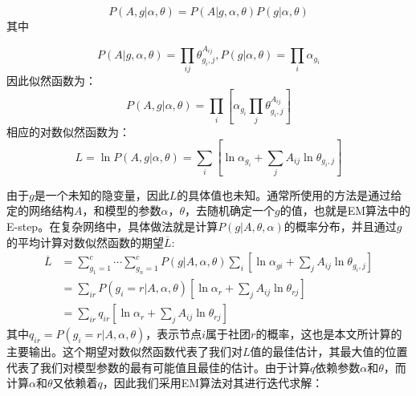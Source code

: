 \documentclass[a4paper,12pt,openany,oneside,utf-8]{ctexbook}
\begin{document}
    \begin{equation}
    P(A,g|\alpha,\theta)=P(A|g,\alpha,\theta)P(g|\alpha,\theta)
    \end{equation}
    其中
    
    \begin{equation}
        P(A|g,\alpha,\theta)=\prod_{i j}\theta_{g_i,j}^{A_{i j}},P(g|\alpha,\theta)=\prod_{i}\alpha_{g_i}
    \end{equation}
    因此似然函数为：
    \begin{equation}
        P(A,g|\alpha,\theta)=\prod_i[\alpha_{g_i}\prod_j\theta_{g_i,j}^{A_{i j}}]
    \end{equation}
    相应的对数似然函数为：
    \begin{equation}
    L=\ln P(A,g|\alpha,\theta)=\sum_i[\ln\alpha_{g_i}+\sum_j A_{i j}\ln\theta_{g_i,j}]
    \end{equation}
    
    由于$g$是一个未知的隐变量，因此$L$的具体值也未知。通常所使用的方法是通过给定的网络结构$A$，和模型的参数$\alpha$，$\theta$，去随机确定一个$g$的值，也就是EM算法中的E-step。在复杂网络中，具体做法就是计算$P(g|A,\theta,\alpha)$的概率分布，并且通过$g$的平均计算对数似然函数的期望$\overline{L}$:
    \begin{equation}\label{eq16}
    \begin{aligned}
        \overline{L}&=\sum_{g_1=1}^{c}\cdots \sum_{g_n=1}^{c}P(g|A,\alpha,\theta)\sum_i[\ln \alpha_{gi}+\sum_jA_{i j}\ln\theta_{g_i,j}]\\&=\sum_{i r}P(g_i = r|A,\alpha,\theta)[\ln\alpha_r+\sum_j A_{i j}\ln\theta_{rj}]\\&=\sum_{ir}q_{ir}[\ln\alpha_r+\sum_j A_{i j}\ln\theta_{rj}]
    \end{aligned}
    \end{equation}
    其中$q_{i r}=P(g_i=r|A,\alpha,\theta)$，表示节点$i$属于社团$r$的概率，这也是本文所计算的主要输出。这个期望对数似然函数代表了我们对$L$值的最佳估计，其最大值的位置代表了我们对模型参数的最有可能值且最佳的估计。由于计算$q$依赖参数$\alpha$和$\theta$，而计算$\alpha$和$\theta$又依赖着$q$，因此我们采用EM算法对其进行迭代求解：
    
\end{document}
